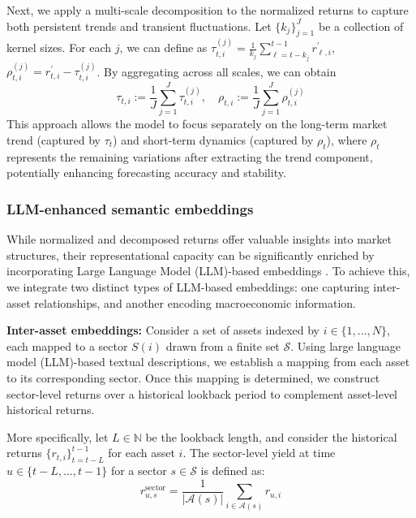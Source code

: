 Next, we apply a multi-scale decomposition \citep{wu2021autoformer, zhou2022fedformer} to the normalized returns to capture both persistent trends and transient fluctuations. Let $\{k_{j}\}_{j=1}^{J}$ be a collection of kernel sizes. For each $j$, we can define as $\tau_{t,i}^{(j)} = \frac{1}{k_j}\sum_{\ell=t-k_j}^{t-1}r_{\ell, i}^{\prime}$, $\rho_{t,i }^{(j)} = r_{t,i}^{\prime}-\tau_{t,i}^{(j)}$. By aggregating across all scales, we can obtain 
\begin{equation}
    \tau_{t,i} := \frac{1}{J}\sum_{j=1}^{J}\tau_{t,i}^{(j)}, \quad \rho_{t,i} := \frac{1}{J}\sum_{j=1}^{J}\rho_{t,i}^{(j)}
\end{equation}
This approach allows the model to focus separately on the long-term market trend (captured by $\tau_t$) and short-term dynamics (captured by $\rho_t$), where $\rho_t$ represents the remaining variations after extracting the trend component, potentially enhancing forecasting accuracy and stability.


\subsubsection{LLM-enhanced semantic embeddings} While normalized and decomposed returns offer valuable insights into market structures, their representational capacity can be significantly enriched by incorporating Large Language Model (LLM)-based embeddings \citep{zhou2023onefitsall, jin2023time, cao2024tempo}. To achieve this, we integrate two distinct types of LLM-based embeddings: one capturing inter-asset relationships, and another encoding macroeconomic information.


\textbf{Inter-asset embeddings:}  Consider a set of assets indexed by $ i \in \{1,\ldots,N\} $, each mapped to a sector $ S(i) $ drawn from a finite set $\mathcal{S}$. Using large language model (LLM)-based textual descriptions, we establish a mapping from each asset to its corresponding sector. Once this mapping is determined, we construct sector-level returns over a historical lookback period to complement asset-level historical returns.

More specifically, let $ L \in \mathbb{N} $ be the lookback length, and consider the historical returns $\{r_{t,i}\}_{t=t-L}^{t-1}$ for each asset $ i $. The sector-level yield at time $ u \in \{t-L,\ldots,t-1\} $ for a sector $ s \in \mathcal{S} $ is defined as:
\begin{equation}
    r_{u,s}^{\text{sector}} = \frac{1}{|\mathcal{A}(s)|} \sum_{i \in \mathcal{A}(s)} r_{u,i}    
\end{equation}

